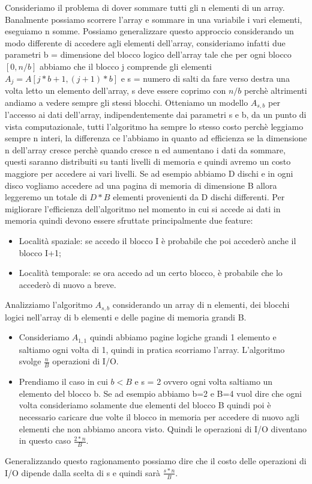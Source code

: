\documentclass[14pt]{extreport}
\begin{document}
Consideriamo il problema di dover sommare tutti gli n elementi di un array.
Banalmente possiamo scorrere l'array e sommare in una variabile i vari elementi, eseguiamo n somme.
Possiamo generalizzare questo approccio considerando un modo differente di accedere agli elementi dell'array, consideriamo infatti due parametri b = dimensione del blocco logico dell'array tale che per ogni blocco $[0,n/b]$ abbiamo che il blocco j comprende gli elementi $A_j = A[j*b+1,(j+1)*b]$ e s = numero di salti da fare verso destra una volta letto un elemento dell'array, s deve essere coprimo con $n/b$ perchè altrimenti andiamo a vedere sempre gli stessi blocchi. Otteniamo un modello $A_{s,b}$ per l'accesso ai dati dell'array, indipendentemente dai parametri s e b, da un punto di vista computazionale, tutti l'algoritmo ha sempre lo stesso costo perchè leggiamo sempre n interi, la differenza ce l'abbiamo in quanto ad efficienza se la dimensione n dell'array cresce perchè quando cresce n ed aumentano i dati da sommare, questi saranno distribuiti su tanti livelli di memoria e quindi avremo un costo maggiore per accedere ai vari livelli. Se ad esempio abbiamo D dischi e in ogni disco vogliamo accedere ad una pagina di memoria di dimensione B allora leggeremo un totale di $D*B$ elementi provenienti da D dischi differenti.
Per migliorare l'efficienza dell'algoritmo nel momento in cui si accede ai dati in memoria quindi devono essere sfruttate principalmente due feature:
\begin{itemize}
\item Località spaziale: se accedo il blocco I è probabile che poi accederò anche il blocco I+1; 
\item Località temporale: se ora accedo ad un certo blocco, è probabile che lo accederò di nuovo a breve.
\end{itemize}

Analizziamo l'algoritmo $A_{s,b}$ considerando un array di n elementi, dei blocchi logici nell'array di b elementi e delle pagine di memoria grandi B.
\begin{itemize}
\item Consideriamo $A_{1,1}$ quindi abbiamo pagine logiche grandi 1 elemento e saltiamo ogni volta di 1, quindi in pratica scorriamo l'array. L'algoritmo svolge $\frac{n}{B}$ operazioni di I/O.
\item Prendiamo il caso in cui $b<B$ e s = 2 ovvero ogni volta saltiamo un elemento del blocco b. Se ad esempio abbiamo b=2 e B=4 vuol dire che ogni volta consideriamo solamente due elementi del blocco B quindi poi è necessario caricare due volte il blocco in memoria per accedere di nuovo agli elementi che non abbiamo ancora visto.
Quindi le operazioni di I/O diventano in questo caso $\frac{2*n}{B}$.
\end{itemize}
Generalizzando questo ragionamento possiamo dire che il costo delle operazioni di I/O dipende dalla scelta di s e quindi sarà $\frac{s*n}{B}$.
\end{document}
